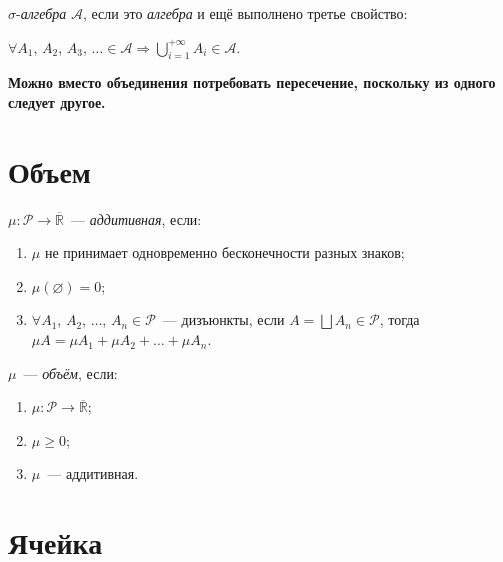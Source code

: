 \documentclass{article}
\begin{document}
        $\sigma$-\textit{алгебра} $\mathcal{A}$, если это \textit{алгебра} и ещё выполнено третье свойство:
        
            $\forall A_1$, $A_2$, $A_3$, $\ldots \in \mathcal{A} \Rightarrow \bigcup\limits_{i = 1}^{+\infty} A_i \in \mathcal{A}$.
            
        \textbf{Можно вместо объединения потребовать пересечение, поскольку из одного следует другое.}
        
    \newpage
    
    \section{Объем}
    
        $\mu : \mathcal{P} \rightarrow \overline{\mathbb{R}}$~--- \textit{аддитивная}, если:
        
        \begin{enumerate}
        
            \item $\mu$ не принимает одновременно бесконечности разных знаков;
            
            \item $\mu(\varnothing) = 0$;
            
            \item $\forall A_1$, $A_2$, $\ldots$, $A_n \in \mathcal{P}$~--- дизъюнкты, если $A = \bigsqcup A_n \in \mathcal{P}$, тогда $\mu A = \mu A_1 + \mu A_2 + \ldots + \mu A_n$.
        
        \end{enumerate}
        
        $\mu$~--- \textit{объём}, если:
        
        \begin{enumerate}
        
            \item $\mu : \mathcal{P} \rightarrow \overline{\mathbb{R}}$;
            
            \item $\mu \geqslant 0$;
            
            \item $\mu$~--- аддитивная.
            
        \end{enumerate}
        
    \newpage
    
    \section{Ячейка}
    
\end{document}
